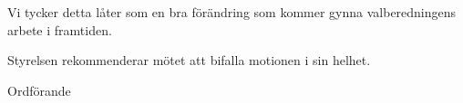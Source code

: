 \documentclass[../_main/handlingar.tex]{subfiles}
\begin{document}
\motionssvar


Vi tycker detta låter som en bra förändring som kommer gynna valberedningens arbete i framtiden. 


Styrelsen rekommenderar mötet att bifalla motionen i sin helhet. 

\begin{signatures}{1}
    \ist
    \signature{\ordf}{Ordförande}
\end{signatures}
\end{document}
